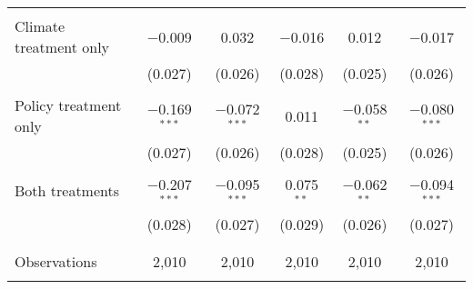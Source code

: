 \begin{tabular}{@{\extracolsep{5pt}}lccccc}
  & & & & & \\ 
 Climate treatment only & $-$0.009 & 0.032 & $-$0.016 & 0.012 & $-$0.017 \\ 
  & (0.027) & (0.026) & (0.028) & (0.025) & (0.026) \\ 
  & & & & & \\ 
 Policy treatment only & $-$0.169$^{***}$ & $-$0.072$^{***}$ & 0.011 & $-$0.058$^{**}$ & $-$0.080$^{***}$ \\ 
  & (0.027) & (0.026) & (0.028) & (0.025) & (0.026) \\ 
  & & & & & \\ 
 Both treatments & $-$0.207$^{***}$ & $-$0.095$^{***}$ & 0.075$^{**}$ & $-$0.062$^{**}$ & $-$0.094$^{***}$ \\ 
  & (0.028) & (0.027) & (0.029) & (0.026) & (0.027) \\ 
  & & & & & \\ 
\hline \\[-1.8ex] 

Observations & 2,010 & 2,010 & 2,010 & 2,010 & 2,010 \\ 
\hline 
\hline \\[-1.8ex] 
\end{tabular} 